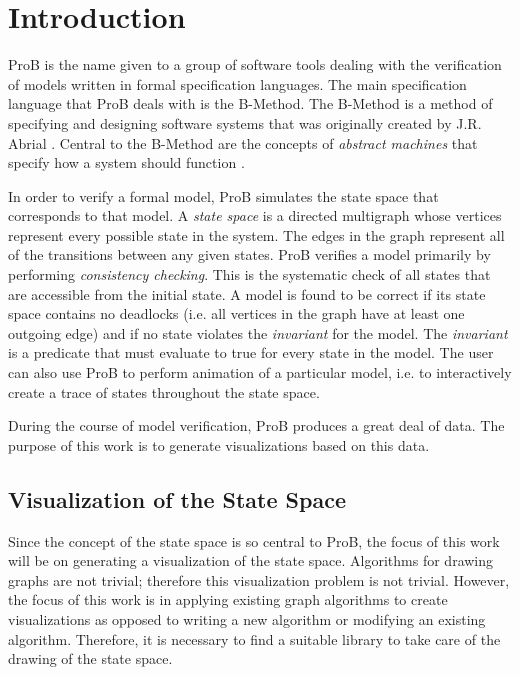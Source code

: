 \section{Introduction}

ProB is the name given to a group of software tools dealing with the verification of models written in formal specification languages. The main specification language that ProB deals with is the B-Method. The B-Method is a method of specifying and designing software systems that was originally created by J.R. Abrial \cite{abrial2005b}. Central to the B-Method are the concepts of \emph{abstract machines} that specify how a system should function \cite{schneider2001b}.

In order to verify a formal model, ProB simulates the state space that corresponds to that model. A \emph{state space} is a directed multigraph whose vertices represent every possible state in the system. The edges in the graph represent all of the transitions between any given states. ProB verifies a model primarily by performing \emph{consistency checking}. This is the systematic check of all states that are accessible from the initial state. A model is found to be correct if its state space contains no deadlocks (i.e. all vertices in the graph have at least one outgoing edge) and if no state violates the \emph{invariant} for the model. The \emph{invariant} is a predicate that must evaluate to true for every state in the model. The user can also use ProB to perform animation of a particular model, i.e. to interactively create a trace of states throughout the state space.

During the course of model verification, ProB produces a great deal of data. The purpose of this work is to generate visualizations based on this data.

\subsection{Visualization of the State Space}

Since the concept of the state space is so central to ProB, the focus of this work will be on generating a visualization of the state space. Algorithms for drawing graphs are not trivial; therefore this visualization problem is not trivial. However, the focus of this work is in applying existing graph algorithms to create visualizations as opposed to writing a new algorithm or modifying an existing algorithm. Therefore, it is necessary to find a suitable library to take care of the drawing of the state space.

